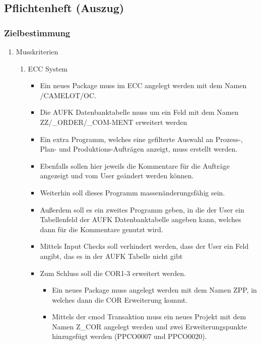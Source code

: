 \subsection{Pflichtenheft (Auszug)}
\label{app:Pflichtenheft}

\subsubsection*{Zielbestimmung}

\begin{enumerate}[itemsep=0em,partopsep=0em,parsep=0em,topsep=0em]
\item Musskriterien %
	\begin{enumerate}
	\item ECC System
		\begin{itemize}
		\item Ein neues Package muss im ECC angelegt werden mit dem Namen /CAMELOT/OC.
		\item Die AUFK Datenbanktabelle muss um ein Feld mit dem Namen ZZ/\_ORDER/\_COM-MENT erweitert werden
		\item Ein extra Programm, welches eine gefilterte Auswahl an Prozess-, Plan- und Produktions-Aufträgen anzeigt, muss erstellt werden.
		\item Ebenfalls sollen hier jeweils die Kommentare für die Aufträge angezeigt und vom User geändert werden können. 
		\item Weiterhin soll dieses Programm massenänderungsfähig sein. 
		\item Außerdem soll es ein zweites Programm geben, in die der User ein Tabellenfeld der AUFK Datenbanktabelle angeben kann, welches dann für die Kommentare genutzt wird.
		\item Mittels Input Checks soll verhindert werden, dass der User ein Feld angibt, das es in der AUFK Tabelle nicht gibt
		\item Zum Schluss soll die COR1-3 erweitert werden.
		\begin{itemize}
			\item Ein neues Package muss angelegt werden mit dem Namen ZPP, in welches dann die COR Erweiterung kommt.
			\item Mittels der cmod Transaktion muss ein neues Projekt mit dem Namen Z\_COR angelegt werden und zwei Erweiterungspunkte hinzugefügt werden (PPCO0007 und PPCO0020).
		\end{itemize}
		\end{itemize} 

\end{enumerate}
\end{enumerate}
